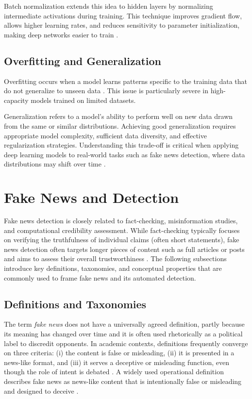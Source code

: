 Batch normalization extends this idea to hidden layers by normalizing intermediate activations during training. This technique improves gradient flow, allows higher learning rates, and reduces sensitivity to parameter initialization, making deep networks easier to train \cite{RAZAVI2021105159}.

\subsection{Overfitting and Generalization}

Overfitting occurs when a model learns patterns specific to the training data that do not generalize to unseen data \cite{valdenegrotoro2022machinelearningstudentsoverfit}. This issue is particularly severe in high-capacity models trained on limited datasets.

Generalization refers to a model’s ability to perform well on new data drawn from the same or similar distributions. Achieving good generalization requires appropriate model complexity, sufficient data diversity, and effective regularization strategies. Understanding this trade-off is critical when applying deep learning models to real-world tasks such as fake news detection, where data distributions may shift over time \cite{raghu2020surveydeeplearningscientific}.

\section{Fake News and Detection}

Fake news detection is closely related to fact-checking, misinformation studies, and computational credibility assessment. While fact-checking typically focuses on verifying the truthfulness of individual claims (often short statements), fake news detection often targets longer pieces of content such as full articles or posts and aims to assess their overall trustworthiness \cite{vykopal2024generativelargelanguagemodels}. The following subsections introduce key definitions, taxonomies, and conceptual properties that are commonly used to frame fake news and its automated detection.

\subsection{Definitions and Taxonomies}

The term \emph{fake news} does not have a universally agreed definition, partly because its meaning has changed over time and it is often used rhetorically as a political label to discredit opponents. In academic contexts, definitions frequently converge on three criteria: (i) the content is false or misleading, (ii) it is presented in a news-like format, and (iii) it serves a deceptive or misleading function, even though the role of intent is debated \cite{encyclopedia2010043}. A widely used operational definition describes fake news as news-like content that is intentionally false or misleading and designed to deceive \cite{fi16080298}.

